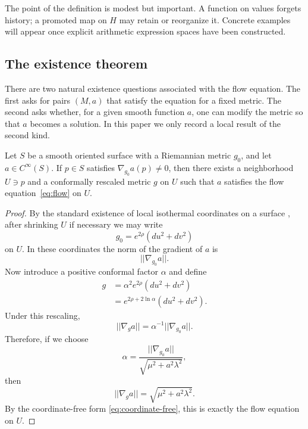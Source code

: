 The point of the definition is modest but important. A function on values forgets history; a promoted map on $H$ may retain or reorganize it. Concrete examples will appear once explicit arithmetic expression spaces have been constructed.

\subsection{The existence theorem}\label{subsec:existence-theorem}

There are two natural existence questions associated with the flow equation. The first asks for pairs $(M,a)$ that satisfy the equation for a fixed metric. The second asks whether, for a given smooth function $a$, one can modify the metric so that $a$ becomes a solution. In this paper we only record a local result of the second kind.

\begin{lemma}
    Let $S$ be a smooth oriented surface with a Riemannian metric $g_0$, and let $a\in C^{\infty}(S)$. If $p\in S$ satisfies $\nabla_{g_0}a(p)\neq 0$, then there exists a neighborhood $U\ni p$ and a conformally rescaled metric $g$ on $U$ such that $a$ satisfies the flow equation~\eqref{eq:flow} on $U$.
    \label{prop:existence2nd}
\end{lemma}

\begin{proof}
By the standard existence of local isothermal coordinates on a surface \cite{doCarmo1976CurvesSurfaces}, after shrinking $U$ if necessary we may write
\[
    g_0 = e^{2\rho}(du^2+dv^2)
\]
on $U$. In these coordinates the norm of the gradient of $a$ is
\[
    ||\nabla_{g_0} a||.
\]
Now introduce a positive conformal factor $\alpha$ and define
\begin{align}
    g &= \alpha^2 e^{2\rho}(du^2+dv^2) \label{eq:morphing}\\
      &= e^{2\rho+2\ln \alpha}(du^2+dv^2).
\end{align}
Under this rescaling,
\[
    ||\nabla_{g} a|| = \alpha^{-1} ||\nabla_{g_0} a||.
\]
Therefore, if we choose
\begin{equation}
    \alpha = \frac{||\nabla_{g_0} a||}{\sqrt{\mu^2 + a^2 \lambda^2}},
    \label{eq:ratio}
\end{equation}
then
\[
    ||\nabla_g a|| = \sqrt{\mu^2 + a^2\lambda^2}.
\]
By the coordinate-free form \eqref{eq:coordinate-free}, this is exactly the flow equation on $U$.
\end{proof}

